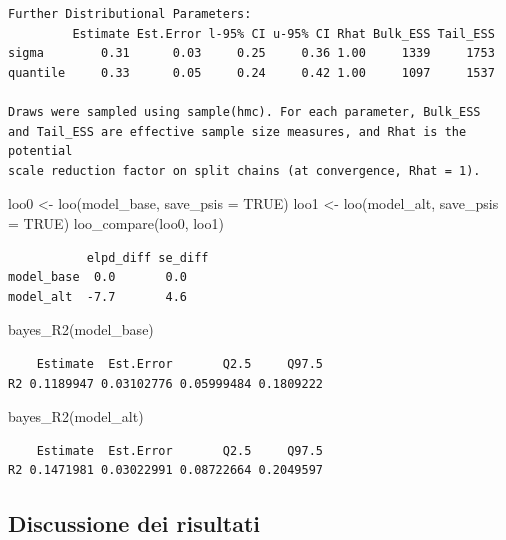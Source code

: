 \documentclass[
  11pt,
  a4paper,
  onecolumn]{article}
\newenvironment{Shaded}{}{}
\newcommand{\AttributeTok}[1]{\textcolor[rgb]{0.84,0.23,0.29}{#1}}
\newcommand{\ConstantTok}[1]{\textcolor[rgb]{0.00,0.36,0.77}{#1}}
\newcommand{\FunctionTok}[1]{\textcolor[rgb]{0.44,0.26,0.76}{#1}}
\newcommand{\NormalTok}[1]{\textcolor[rgb]{0.14,0.16,0.18}{#1}}
\newcommand{\OtherTok}[1]{\textcolor[rgb]{0.44,0.26,0.76}{#1}}
\begin{document}
\begin{verbatim}
Further Distributional Parameters:
         Estimate Est.Error l-95% CI u-95% CI Rhat Bulk_ESS Tail_ESS
sigma        0.31      0.03     0.25     0.36 1.00     1339     1753
quantile     0.33      0.05     0.24     0.42 1.00     1097     1537

Draws were sampled using sample(hmc). For each parameter, Bulk_ESS
and Tail_ESS are effective sample size measures, and Rhat is the potential
scale reduction factor on split chains (at convergence, Rhat = 1).
\end{verbatim}

\begin{Shaded}
\begin{Highlighting}[]
\NormalTok{loo0 }\OtherTok{\textless{}{-}} \FunctionTok{loo}\NormalTok{(model\_base, }\AttributeTok{save\_psis =} \ConstantTok{TRUE}\NormalTok{)}
\NormalTok{loo1 }\OtherTok{\textless{}{-}} \FunctionTok{loo}\NormalTok{(model\_alt, }\AttributeTok{save\_psis =} \ConstantTok{TRUE}\NormalTok{)}
\FunctionTok{loo\_compare}\NormalTok{(loo0, loo1)}
\end{Highlighting}
\end{Shaded}

\begin{verbatim}
           elpd_diff se_diff
model_base  0.0       0.0   
model_alt  -7.7       4.6   
\end{verbatim}

\begin{Shaded}
\begin{Highlighting}[]
\FunctionTok{bayes\_R2}\NormalTok{(model\_base)}
\end{Highlighting}
\end{Shaded}

\begin{verbatim}
    Estimate  Est.Error       Q2.5     Q97.5
R2 0.1189947 0.03102776 0.05999484 0.1809222
\end{verbatim}

\begin{Shaded}
\begin{Highlighting}[]
\FunctionTok{bayes\_R2}\NormalTok{(model\_alt)}
\end{Highlighting}
\end{Shaded}

\begin{verbatim}
    Estimate  Est.Error       Q2.5     Q97.5
R2 0.1471981 0.03022991 0.08722664 0.2049597
\end{verbatim}

\subsection{Discussione dei risultati}\label{discussione-dei-risultati}
\end{document}
